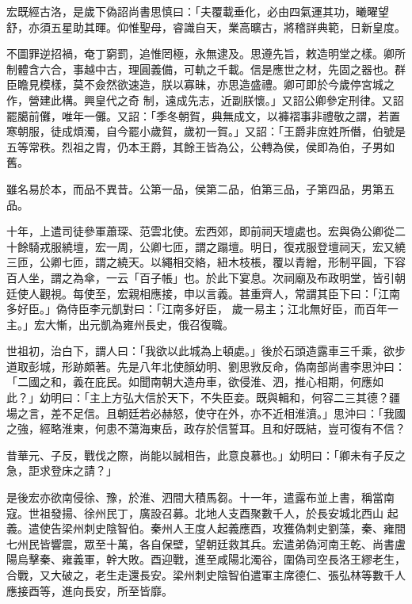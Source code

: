 \begin{pinyinscope}
 宏既經古洛，是歲下偽詔尚書思慎曰：「夫覆載垂化，必由四氣運其功，曦曜望舒，亦須五星助其暉。仰惟聖母，睿識自天，業高曠古，將稽詳典範，日新皇度。



 不圖罪逆招禍，奄丁窮罰，追惟罔極，永無逮及。思遵先旨，敕造明堂之樣。卿所制體含六合，事越中古，理圓義備，可軌之千載。信是應世之材，先固之器也。群臣瞻見模樣，莫不僉然欲速造，朕以寡昧，亦思造盛禮。卿可即於今歲停宮城之作，營建此構。興皇代之奇
 制，遠成先志，近副朕懷。」又詔公卿參定刑律。又詔罷臈前儺，唯年一儺。又詔：「季冬朝賀，典無成文，以褲褶事非禮敬之謂，若置寒朝服，徒成煩濁，自今罷小歲賀，歲初一賀。」又詔：「王爵非庶姓所僭，伯號是五等常秩。烈祖之胄，仍本王爵，其餘王皆為公，公轉為侯，侯即為伯，子男如舊。



 雖名易於本，而品不異昔。公第一品，侯第二品，伯第三品，子第四品，男第五品。



 十年，上遣司徒參軍蕭琛、范雲北使。宏西郊，即前祠天壇處也。宏與偽公卿從二十餘騎戎服繞壇，宏一周，公卿七匝，謂之蹋壇。明日，復戎服登壇祠天，宏又繞三匝，公卿七匝，謂之繞天。以繩相交絡，紐木枝棖，覆以青繒，形制平圓，下容百人坐，謂之為傘，一云「百子帳」也。於此下宴息。次祠廟及布政明堂，皆引朝廷使人觀視。每使至，宏親相應接，申以言義。甚重齊人，常謂其臣下曰：「江南多好臣。」偽侍臣李元凱對曰：「江南多好臣，
 歲一易主；江北無好臣，而百年一主。」宏大慚，出元凱為雍州長史，俄召復職。



 世祖初，治白下，謂人曰：「我欲以此城為上頓處。」後於石頭造露車三千乘，欲步道取彭城，形跡頗著。先是八年北使顏幼明、劉思敩反命，偽南部尚書李思沖曰：「二國之和，義在庇民。如聞南朝大造舟車，欲侵淮、泗，推心相期，何應如此？」幼明曰：「主上方弘大信於天下，不失臣妾。既與輯和，何容二三其德？疆場之言，差不足信。且朝廷若必赫怒，使守在外，亦不近相淮濆。」思沖曰：「我國之強，經略淮東，何患不蕩海東岳，政存於信誓耳。且和好既結，豈可復有不信？



 昔華元、子反，戰伐之際，尚能以誠相告，此意良慕也。」幼明曰：「卿未有子反之急，詎求登床之請？」



 是後宏亦欲南侵徐、豫，於淮、泗間大積馬芻。十一年，遣露布並上書，稱當南寇。世祖發揚、徐州民丁，廣設召募。北地人支酉聚數千人，於長安城北西山
 起義。遣使告梁州刺史陰智伯。秦州人王度人起義應酉，攻獲偽刺史劉藻，秦、雍間七州民皆響震，眾至十萬，各自保壁，望朝廷救其兵。宏遣弟偽河南王乾、尚書盧陽烏擊秦、雍義軍，幹大敗。酉迎戰，進至咸陽北濁谷，圍偽司空長洛王繆老生，合戰，又大破之，老生走還長安。梁州刺史陰智伯遣軍主席德仁、張弘林等數千人應接酉等，進向長安，所至皆靡。




\end{pinyinscope}

